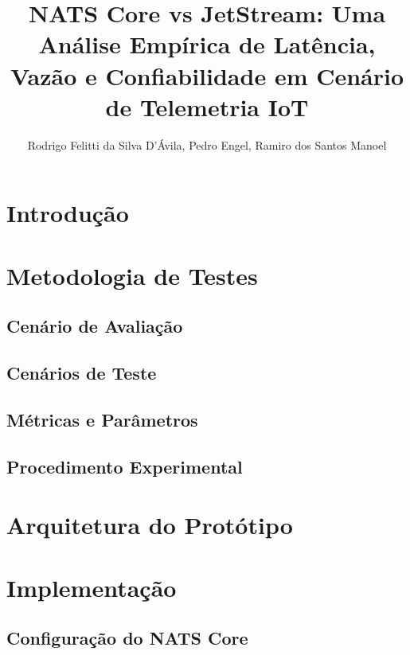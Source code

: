 \documentclass[12pt]{article}
\title{NATS Core vs JetStream: Uma Análise Empírica de Latência, Vazão e Confiabilidade em Cenário de Telemetria IoT}
\author{Rodrigo Felitti da Silva D'Ávila\inst{1}, Pedro Engel\inst{1}, Ramiro dos Santos Manoel\inst{1}}
\begin{document}
\maketitle

\begin{resumo}

\end{resumo}


\section{Introdução}
\label{sec:introducao}


\section{Metodologia de Testes}
\label{sec:metodologia}

\subsection{Cenário de Avaliação}

\subsection{Cenários de Teste}

\subsection{Métricas e Parâmetros}

\subsection{Procedimento Experimental}


\section{Arquitetura do Protótipo}
\label{sec:arquitetura}


\section{Implementação}
\label{sec:implementacao}

\subsection{Configuração do NATS Core}
\label{sec:impl-core}
\end{document}
